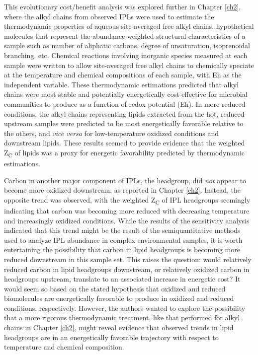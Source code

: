 This evolutionary cost/benefit analysis was explored further in Chapter \ref{ch2}, where the alkyl chains from observed IPLs were used to estimate the thermodynamic properties of aqueous site-averaged free alkyl chains, hypothetical molecules that represent the abundance-weighted structural characteristics of a sample such as number of aliphatic carbons, degree of unsaturation, isoprenoidal branching, etc. Chemical reactions involving inorganic species measured at each sample were written to allow site-averaged free alkyl chains to chemically speciate at the temperature and chemical compositions of each sample, with Eh as the independent variable. These thermodynamic estimations predicted that alkyl chains were most stable and potentially energetically cost-effective for microbial communities to produce as a function of redox potential (Eh). In more reduced conditions, the alkyl chains representing lipids extracted from the hot, reduced upstream samples were predicted to be most energetically favorable relative to the others, and \textit{vice versa} for low-temperature oxidized conditions and downstream lipids. These results seemed to provide evidence that the weighted Z\textsubscript{C} of lipids was a proxy for energetic favorability predicted by thermodynamic estimations.

Carbon in another major component of IPLs, the headgroup, did \textit{not} appear to become more oxidized downstream, as reported in Chapter \ref{ch2}. Instead, the opposite trend was observed, with the weighted Z\textsubscript{C} of IPL headgroups seemingly indicating that carbon was becoming more reduced with decreasing temperature and increasingly oxidized conditions. While the results of the sensitivity analysis indicated that this trend might be the result of the semiquantitative methods used to analyze IPL abundance in complex environmental samples, it is worth entertaining the possibility that carbon in lipid headgroups is becoming more reduced downstream in this sample set. This raises the question: would relatively reduced carbon in lipid headgroups downstream, or relatively oxidized carbon in headgroups upstream, translate to an associated increase in energetic cost? It would seem so based on the stated hypothesis that oxidized and reduced biomolecules are energetically favorable to produce in oxidized and reduced conditions, respectively. However, the authors wanted to explore the possibility that a more rigorous thermodynamic treatment, like that performed for alkyl chains in Chapter \ref{ch2}, might reveal evidence that observed trends in lipid headgroups are in an energetically favorable trajectory with respect to temperature and chemical composition.

